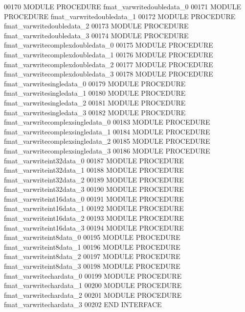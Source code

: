 \begin{DoxyCode}
00170         \textcolor{keyword}{MODULE PROCEDURE} fmat\_varwritedoubledata\_0
00171         \textcolor{keyword}{MODULE PROCEDURE} fmat\_varwritedoubledata\_1
00172         \textcolor{keyword}{MODULE PROCEDURE} fmat\_varwritedoubledata\_2
00173         \textcolor{keyword}{MODULE PROCEDURE} fmat\_varwritedoubledata\_3
00174         \textcolor{keyword}{MODULE PROCEDURE} fmat\_varwritecomplexdoubledata\_0
00175         \textcolor{keyword}{MODULE PROCEDURE} fmat\_varwritecomplexdoubledata\_1
00176         \textcolor{keyword}{MODULE PROCEDURE} fmat\_varwritecomplexdoubledata\_2
00177         \textcolor{keyword}{MODULE PROCEDURE} fmat\_varwritecomplexdoubledata\_3
00178         \textcolor{keyword}{MODULE PROCEDURE} fmat\_varwritesingledata\_0
00179         \textcolor{keyword}{MODULE PROCEDURE} fmat\_varwritesingledata\_1
00180         \textcolor{keyword}{MODULE PROCEDURE} fmat\_varwritesingledata\_2
00181         \textcolor{keyword}{MODULE PROCEDURE} fmat\_varwritesingledata\_3
00182         \textcolor{keyword}{MODULE PROCEDURE} fmat\_varwritecomplexsingledata\_0
00183         \textcolor{keyword}{MODULE PROCEDURE} fmat\_varwritecomplexsingledata\_1
00184         \textcolor{keyword}{MODULE PROCEDURE} fmat\_varwritecomplexsingledata\_2
00185         \textcolor{keyword}{MODULE PROCEDURE} fmat\_varwritecomplexsingledata\_3
00186         \textcolor{keyword}{MODULE PROCEDURE} fmat\_varwriteint32data\_0
00187         \textcolor{keyword}{MODULE PROCEDURE} fmat\_varwriteint32data\_1
00188         \textcolor{keyword}{MODULE PROCEDURE} fmat\_varwriteint32data\_2
00189         \textcolor{keyword}{MODULE PROCEDURE} fmat\_varwriteint32data\_3
00190         \textcolor{keyword}{MODULE PROCEDURE} fmat\_varwriteint16data\_0
00191         \textcolor{keyword}{MODULE PROCEDURE} fmat\_varwriteint16data\_1
00192         \textcolor{keyword}{MODULE PROCEDURE} fmat\_varwriteint16data\_2
00193         \textcolor{keyword}{MODULE PROCEDURE} fmat\_varwriteint16data\_3
00194         \textcolor{keyword}{MODULE PROCEDURE} fmat\_varwriteint8data\_0
00195         \textcolor{keyword}{MODULE PROCEDURE} fmat\_varwriteint8data\_1
00196         \textcolor{keyword}{MODULE PROCEDURE} fmat\_varwriteint8data\_2
00197         \textcolor{keyword}{MODULE PROCEDURE} fmat\_varwriteint8data\_3
00198         \textcolor{keyword}{MODULE PROCEDURE} fmat\_varwritechardata\_0
00199         \textcolor{keyword}{MODULE PROCEDURE} fmat\_varwritechardata\_1
00200         \textcolor{keyword}{MODULE PROCEDURE} fmat\_varwritechardata\_2
00201         \textcolor{keyword}{MODULE PROCEDURE} fmat\_varwritechardata\_3
00202 \textcolor{keyword}{    END INTERFACE}

\end{DoxyCode}
